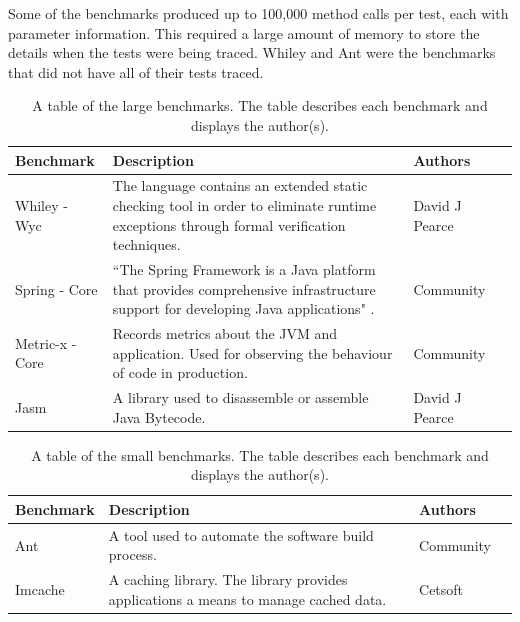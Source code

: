 Some of the benchmarks produced up to 100,000 method calls per test, each with parameter information. This required a large amount of memory to store the details when the tests were being traced. Whiley and Ant were the benchmarks that did not have all of their tests traced. 

\begin{table}[H]
\centering
\begin{tabular}{|l|l|l|l|}
\hline
{\bf Benchmark}       &  {\bf Description}  & {\bf Authors}   \\ \hline
Whiley - Wyc         &     \begin{minipage}[t]{0.6\columnwidth} The language contains an extended static checking tool in order to eliminate runtime exceptions through formal verification techniques. 
\end{minipage}     & David J Pearce          \\ \hline
Spring - Core   &  \begin{minipage}[t]{0.6\columnwidth} ``The Spring Framework is a Java platform that provides comprehensive infrastructure support for developing Java applications" \cite{spring} .
\end{minipage}       & Community \\ \hline
Metric-x - Core &     \begin{minipage}[t]{0.6\columnwidth} Records metrics about the JVM and application. Used for observing the behaviour of code in production.
\end{minipage}        & Community \\ \hline
Jasm              &     \begin{minipage}[t]{0.6\columnwidth} A library used to disassemble or assemble Java Bytecode. 
\end{minipage}          & David J Pearce \\ \hline

\end{tabular}
\caption{A table of the large benchmarks. The table describes each benchmark and displays the author(s).}
\label{large_testdes}
\end{table}

\begin{table}[H]
\centering
\begin{tabular}{|l|l|l|l|}
\hline
{\bf Benchmark}   & {\bf Description}  & {\bf Authors}  \\ \hline
Ant             &    \begin{minipage}[t]{0.6\columnwidth} A tool used to automate the software build process. 
\end{minipage}  & Community \\ \hline
Imcache &      \begin{minipage}[t]{0.6\columnwidth} A caching library. The library provides applications a means to manage cached data. 
\end{minipage}     & Cetsoft \\ \hline
\end{tabular}
\caption{A table of the small benchmarks. The table describes each benchmark and displays the author(s).}
\label{small_testdes}
\end{table}


